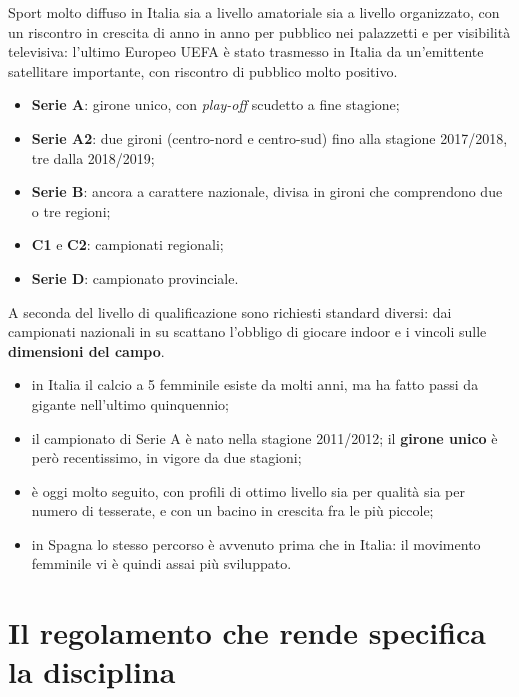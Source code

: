 Sport molto diffuso in Italia sia a livello amatoriale sia a livello organizzato, con un riscontro
in crescita di anno in anno per pubblico nei palazzetti e per visibilità televisiva: l'ultimo
Europeo UEFA è stato trasmesso in Italia da un'emittente satellitare importante, con riscontro di
pubblico molto positivo.

\begin{itemize}
  \item \textbf{Serie A}: girone unico, con \textit{play-off} scudetto a fine stagione;
  \item \textbf{Serie A2}: due gironi (centro-nord e centro-sud) fino alla stagione 2017/2018, tre
    dalla 2018/2019;
  \item \textbf{Serie B}: ancora a carattere nazionale, divisa in gironi che comprendono due o tre
    regioni;
  \item \textbf{C1} e \textbf{C2}: campionati regionali;
  \item \textbf{Serie D}: campionato provinciale.
\end{itemize}
A seconda del livello di qualificazione sono richiesti standard diversi: dai campionati nazionali in
su scattano l'obbligo di giocare indoor e i vincoli sulle \textbf{dimensioni del campo}.

\begin{itemize}
  \item in Italia il calcio a 5 femminile esiste da molti anni, ma ha fatto passi da gigante
    nell'ultimo quinquennio;
  \item il campionato di Serie A è nato nella stagione 2011/2012; il \textbf{girone unico} è però
    recentissimo, in vigore da due stagioni;
  \item è oggi molto seguito, con profili di ottimo livello sia per qualità sia per numero di
    tesserate, e con un bacino in crescita fra le più piccole;
  \item in Spagna lo stesso percorso è avvenuto prima che in Italia: il movimento femminile vi è
    quindi assai più sviluppato.
\end{itemize}

\section{Il regolamento che rende specifica la disciplina}

